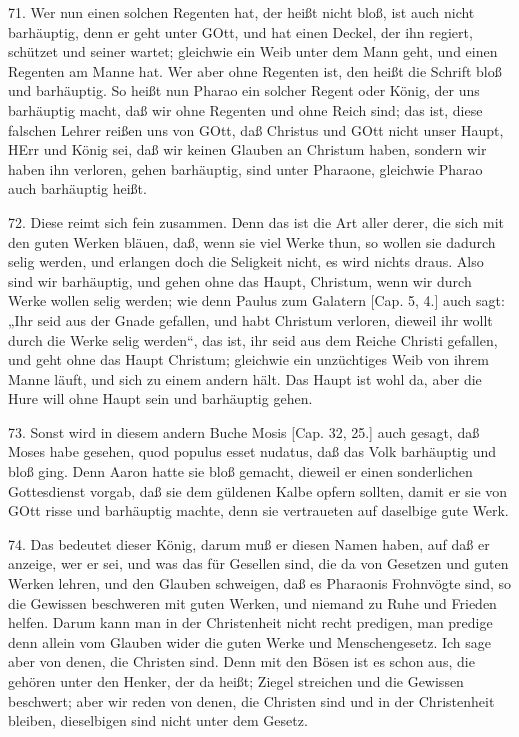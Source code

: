 71. Wer nun einen solchen Regenten hat, der heißt nicht bloß, ist auch nicht barhäuptig, denn er geht unter GOtt, und hat einen Deckel, der ihn regiert, schützet und seiner wartet; gleichwie ein Weib unter dem Mann geht, und einen Regenten am Manne hat. Wer aber ohne Regenten ist, den heißt die Schrift bloß und barhäuptig. So heißt nun Pharao ein solcher Regent oder König, der uns barhäuptig macht, daß wir ohne Regenten und ohne Reich sind; das ist, diese falschen Lehrer reißen uns von GOtt, daß Christus und GOtt nicht unser Haupt, HErr und König sei, daß wir keinen Glauben an Christum haben, sondern wir haben ihn verloren, gehen barhäuptig, sind unter Pharaone, gleichwie Pharao auch barhäuptig heißt.

72. Diese reimt sich fein zusammen. Denn das ist die Art aller derer, die sich mit den guten Werken bläuen, daß, wenn sie viel Werke thun, so wollen sie dadurch selig werden, und erlangen doch die Seligkeit nicht, es wird nichts draus. Also sind wir barhäuptig, und gehen ohne das Haupt, Christum, wenn wir durch Werke wollen selig werden; wie denn Paulus zum Galatern [Cap. 5, 4.] auch sagt: „Ihr seid aus der Gnade gefallen, und habt Christum verloren, dieweil ihr wollt durch die Werke selig werden“, das ist, ihr seid aus dem Reiche Christi gefallen, und geht ohne das Haupt Christum; gleichwie ein unzüchtiges Weib von ihrem Manne läuft, und sich zu einem andern hält. Das Haupt ist wohl da, aber die Hure will ohne Haupt sein und barhäuptig gehen.

73. Sonst wird in diesem andern Buche Mosis [Cap. 32, 25.] auch gesagt, daß Moses habe gesehen, quod populus esset nudatus, daß das Volk barhäuptig und bloß ging. Denn Aaron hatte sie bloß gemacht, dieweil er einen sonderlichen Gottesdienst vorgab, daß sie dem güldenen Kalbe opfern sollten, damit er sie von GOtt risse und barhäuptig machte, denn sie vertraueten auf daselbige gute Werk.

74. Das bedeutet dieser König, darum muß er diesen Namen haben, auf daß er anzeige, wer er sei, und was das für Gesellen sind, die da von Gesetzen und guten Werken lehren, und den Glauben schweigen, daß es Pharaonis Frohnvögte sind, so die Gewissen beschweren mit guten Werken, und niemand zu Ruhe und Frieden helfen. Darum kann man in der Christenheit nicht recht predigen, man predige denn allein vom Glauben wider die guten Werke und Menschengesetz. Ich sage aber von denen, die Christen sind. Denn mit den Bösen ist es schon aus, die gehören unter den Henker, der da heißt; Ziegel streichen und die Gewissen beschwert; aber wir reden von denen, die Christen sind und in der Christenheit bleiben, dieselbigen sind nicht unter dem Gesetz.


